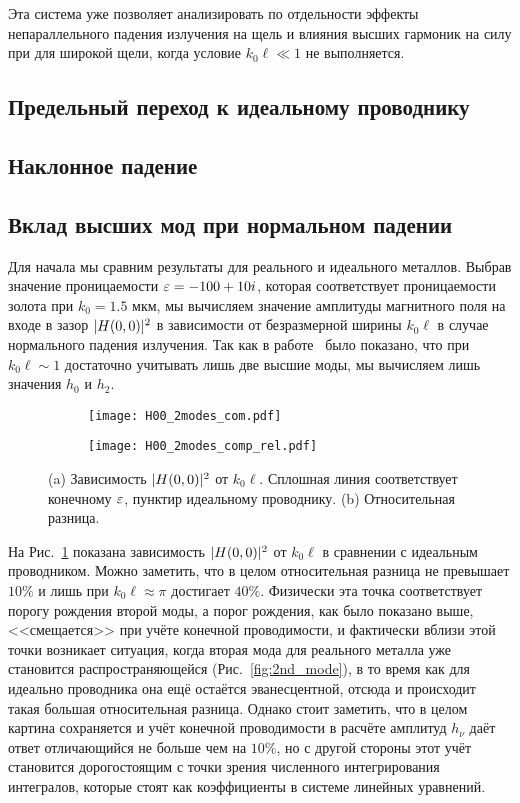 Эта система уже позволяет анализировать по отдельности эффекты непараллельного падения излучения на щель и влияния высших гармоник на силу
при для широкой щели, когда условие $k_0 \ell \ll 1$ не выполняется.

\subsection{Предельный переход к идеальному проводнику}

\subsection{Наклонное падение}

\subsection{Вклад высших мод при нормальном падении}
Для начала мы сравним результаты для реального и идеального металлов. Выбрав значение проницаемости $\varepsilon = -100 + 10i$, которая соответствует 
проницаемости золота при $k_0 = 1.5$ мкм, мы вычисляем значение амплитуды магнитного поля на входе в зазор $\lvert H(0,0)\rvert^2$ в зависимости от 
безразмерной ширины $k_0 \ell$ в случае нормального падения излучения. Так как в работе~\cite{Shapiro16} было показано, что при 
$k_0 \ell \sim 1$ достаточно учитывать лишь две высшие моды, мы вычисляем лишь значения $h_0$ и $h_2$.

\begin{figure}
  \begin{subfigure}[t]{0.45\textwidth}
    \texttt{[image: H00\_2modes\_com.pdf]}
  \end{subfigure}
  \begin{subfigure}[t]{0.45\textwidth}
    \texttt{[image: H00\_2modes\_comp\_rel.pdf]}
  \end{subfigure}
  \caption{(a) Зависимость $\lvert H(0,0)\rvert^2$ от $k_0 \ell$. Сплошная линия соответствует конечному $\varepsilon$, пунктир идеальному проводнику. (b) Относительная разница.}	\label{pic:comp}
\end{figure}

На Рис.~\ref{pic:comp} показана зависимость $\lvert H(0,0)\rvert^2$ от $k_0 \ell$ в сравнении с идеальным проводником. Можно заметить, что в целом 
относительная разница не превышает  $10\%$ и лишь при  $k_0 \ell \approx \pi$ достигает $40\%$. Физически эта точка 
соответствует порогу рождения второй моды, а порог рождения, как было показано выше, <<смещается>> при учёте конечной проводимости, и фактически
вблизи этой точки возникает ситуация, когда вторая мода для реального металла уже становится распространяющейся (Рис.~\ref{fig:2nd_mode}), 
в то время как для идеально проводника
она ещё остаётся эванесцентной, отсюда и происходит такая большая относительная разница. Однако стоит заметить, что в целом картина сохраняется
и учёт конечной проводимости в расчёте амплитуд $h_\nu$ даёт ответ отличающийся не больше чем на $10\%$, но с другой стороны этот учёт 
становится дорогостоящим с точки зрения численного интегрирования интегралов, которые стоят как коэффициенты в системе линейных уравнений.

